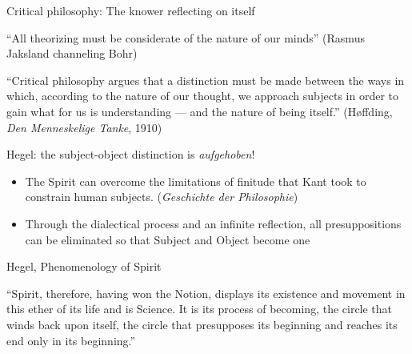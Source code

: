 \documentclass[ignorenonframetext, ]{beamer}
\begin{document}
\begin{frame}{Critical philosophy: The knower reflecting on itself}

  ``All theorizing must be considerate of the nature of our minds''
  \newline (Rasmus Jaksland channeling Bohr)

  \vfill ``Critical philosophy argues that a distinction must be made
  between the ways in which, according to the nature of our thought,
  we approach subjects in order to gain what for us is understanding
  --- and the nature of being itself.'' \newline (Høffding, \emph{Den
    Menneskelige Tanke}, 1910)

\end{frame}

\begin{frame}{Hegel: the subject-object distinction is \emph{aufgehoben}!}

  \begin{itemize}
  \item The Spirit can overcome the limitations of finitude that Kant
    took to constrain human subjects. (\emph{Geschichte der
      Philosophie})
  \item Through the dialectical process and an infinite reflection,
    all presuppositions can be eliminated so that Subject and Object
    become one
  \end{itemize}
  
\end{frame}


\begin{frame}{Hegel, Phenomenology of Spirit}

  ``Spirit, therefore, having won the Notion, displays its existence
  and movement in this ether of its life and is Science. It is its
  process of becoming, the circle that winds back upon itself, the
  circle that presupposes its beginning and reaches its end only in
  its beginning.''


\end{frame}
\end{document}
